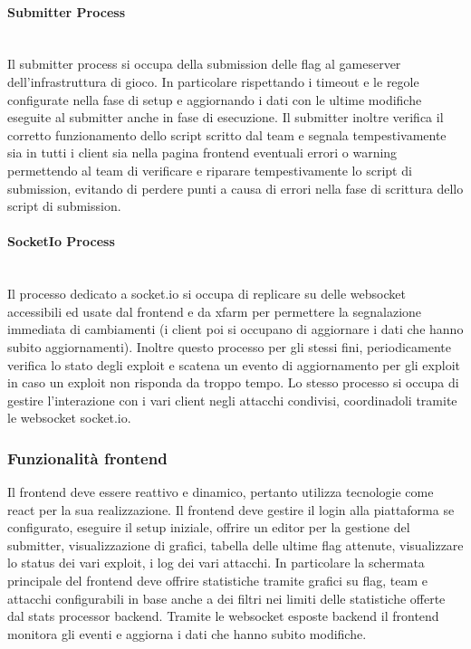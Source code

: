 \documentclass[11pt]{article}
\begin{document}
\paragraph{Submitter Process}\mbox{}\\
Il submitter process si occupa della submission delle flag al gameserver dell'infrastruttura di gioco. In particolare rispettando i timeout e le regole configurate nella fase di setup e aggiornando i dati con le ultime modifiche eseguite al submitter anche in fase di esecuzione.
Il submitter inoltre verifica il corretto funzionamento dello script scritto dal team e segnala tempestivamente sia in tutti i client sia nella pagina frontend eventuali errori o warning permettendo al team di verificare e riparare tempestivamente lo script di submission, evitando di perdere punti a causa di errori nella fase di scrittura dello script di submission.
\paragraph{SocketIo Process}\mbox{}\\
Il processo dedicato a socket.io si occupa di replicare su delle websocket accessibili ed usate dal frontend e da xfarm per permettere la segnalazione immediata di cambiamenti (i client poi si occupano di aggiornare i dati che hanno subito aggiornamenti).
Inoltre questo processo per gli stessi fini, periodicamente verifica lo stato degli exploit e scatena un evento di aggiornamento per gli exploit in caso un exploit non risponda da troppo tempo. Lo stesso processo si occupa di gestire l'interazione con i vari client negli attacchi condivisi, coordinadoli tramite le websocket socket.io.
\subsubsection{Funzionalità frontend}
Il frontend deve essere reattivo e dinamico, pertanto utilizza tecnologie come react per la sua realizzazione. Il frontend deve gestire il login alla piattaforma se configurato, eseguire il setup iniziale, offrire un editor per la gestione del submitter, visualizzazione di grafici, tabella delle ultime flag attenute, visualizzare lo status dei vari exploit, i log dei vari attacchi.
In particolare la schermata principale del frontend deve offrire statistiche tramite grafici su flag, team e attacchi configurabili in base anche a dei filtri nei limiti delle statistiche offerte dal stats processor backend.
Tramite le websocket esposte backend il frontend monitora gli eventi e aggiorna i dati che hanno subito modifiche.
\end{document}
